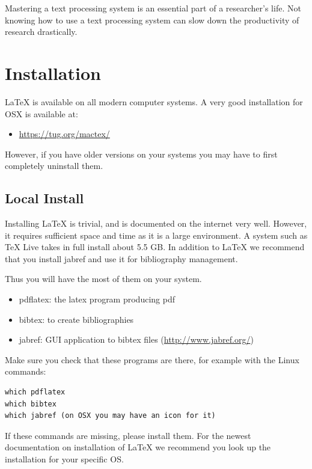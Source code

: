 \FILENAME

Mastering a text processing system is an essential part of a
researcher's life. Not knowing how to use a text processing system can
slow down the productivity of research drastically.

\section{Installation}
\label{installation}

LaTeX is available on all modern computer systems. A very good
installation for OSX is available at:

\begin{itemize}
\item
  \url{https://tug.org/mactex/}
\end{itemize}


However, if you have older versions on your systems you may have to
first completely uninstall them.

\subsection{Local Install}\label{local-install}

Installing LaTeX is trivial, and is documented on the internet very
well. However, it requires sufficient space and time as it is a large
environment. A system such as TeX Live takes in full install about 5.5
GB. In addition to LaTeX we recommend that you install jabref and use it
for bibliography management.

Thus you will have the most of them on your system.

\begin{itemize}

\item
  pdflatex: the latex program producing pdf
\item
  bibtex: to create bibliographies
\item
  jabref: GUI application to bibtex files (\url{http://www.jabref.org/})
\end{itemize}

Make sure you check that these programs are there, for example with the
Linux commands:

\begin{verbatim}
which pdflatex
which bibtex
which jabref (on OSX you may have an icon for it)
\end{verbatim}

If these commands are missing, please install them. For the newest
documentation on installation of LaTeX we recommend you look up the
installation for your specific OS.

